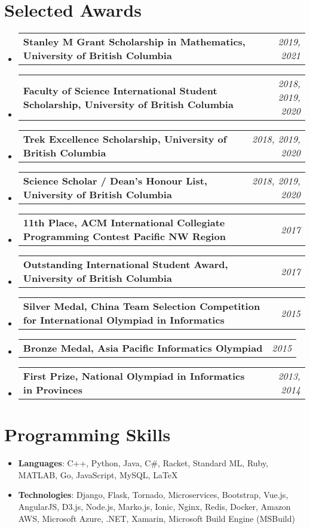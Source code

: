 \documentclass[letterpaper,11pt]{article}
\makeatletter
\newcommand{\resumeItem}[2]{
  \item\small{
    \textbf{#1}{: #2 \vspace{-2pt}}
  }
}
\newcommand{\awardSubItem}[2]{
  \item
    \begin{tabular*}{0.97\textwidth}{l@{\extracolsep{\fill}}r}
      \textbf{\small #1} & \textit{\small #2} \\
    \end{tabular*}\vspace{-8pt}
}
\newcommand{\resumeSubItem}[2]{\resumeItem{#1}{#2}\vspace{-4pt}}
\newcommand{\resumeSubHeadingListStart}{\begin{itemize}[leftmargin=*]}
\newcommand{\resumeSubHeadingListEnd}{\end{itemize}}
\makeatother
\begin{document}
\section{Selected Awards}
  \resumeSubHeadingListStart
    \awardSubItem{Stanley M Grant Scholarship in Mathematics, University of British Columbia}{2019, 2021}
    \awardSubItem{Faculty of Science International Student Scholarship, University of British Columbia}{2018, 2019, 2020}
    \awardSubItem{Trek Excellence Scholarship, University of British Columbia}{2018, 2019, 2020}
    \awardSubItem{Science Scholar / Dean's Honour List, University of British Columbia}{2018, 2019, 2020}
    \awardSubItem{11th Place, ACM International Collegiate Programming Contest Pacific NW Region}{2017}
    \awardSubItem{Outstanding International Student Award, University of British Columbia}{2017}
    \awardSubItem{Silver Medal, China Team Selection Competition for International Olympiad in Informatics}{2015}
    \awardSubItem{Bronze Medal, Asia Pacific Informatics Olympiad}{2015}
    \awardSubItem{First Prize, National Olympiad in Informatics in Provinces}{2013, 2014}
  \resumeSubHeadingListEnd

\section{Programming Skills}
  \resumeSubHeadingListStart
    \resumeSubItem{Languages}
      {C++, Python, Java, C\#, Racket, Standard ML, Ruby, MATLAB, Go, JavaScript, MySQL, \LaTeX} \\
    \resumeSubItem{Technologies}
      {Django, Flask, Tornado, Microservices, Bootstrap, Vue.js, AngularJS, D3.js, Node.js, Marko.js, Ionic, Nginx, Redis, Docker, Amazon AWS, Microsoft Azure, .NET, Xamarin, Microsoft Build Engine (MSBuild)} \\
  \resumeSubHeadingListEnd


\end{document}
